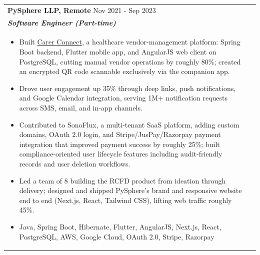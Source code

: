 \documentclass[a4paper,8pt]{article}
\begin{document}
\begin{tabularx}{\linewidth}{ @{}l r@{} }
\color[HTML]{1C033C} \textbf{PySphere LLP, Remote} \hfill \color[HTML]{371e77} Nov 2021 - Sep 2023 \\[4pt]
\color[HTML]{371e77}\textbf{\textit{Software Engineer (Part-time)}}\ \hfill \color[HTML]{4B28A4} \\[5pt]
\begin{minipage}[t]{\linewidth}
    \begin{itemize}[nosep,after=\strut, leftmargin=2em, itemsep=2pt]
        \item Built \href{https://carerconnect.co.uk/}{Carer Connect}, a healthcare vendor-management platform: Spring Boot backend, Flutter mobile app, and AngularJS web client on PostgreSQL, cutting manual vendor operations by roughly 80\%; created an encrypted QR code scannable exclusively via the companion app.
        \item Drove user engagement up 35\% through deep links, push notifications, and Google Calendar integration, serving 1M+ notification requests across SMS, email, and in-app channels.
        \item Contributed to SonoFlux, a multi-tenant SaaS platform, adding custom domains, OAuth 2.0 login, and Stripe/JusPay/Razorpay payment integration that improved payment success by roughly 25\%; built compliance-oriented user lifecycle features including audit-friendly records and user deletion workflows.
        \item Led a team of 8 building the RCFD product from ideation through delivery; designed and shipped PySphere's brand and responsive website end to end (Next.js, React, Tailwind CSS), lifting web traffic roughly 45\%.
        \item Java, Spring Boot, Hibernate, Flutter, AngularJS, Next.js, React, PostgreSQL, AWS, Google Cloud, OAuth 2.0, Stripe, Razorpay
    \end{itemize}
\end{minipage}
\end{tabularx}
\end{document}
